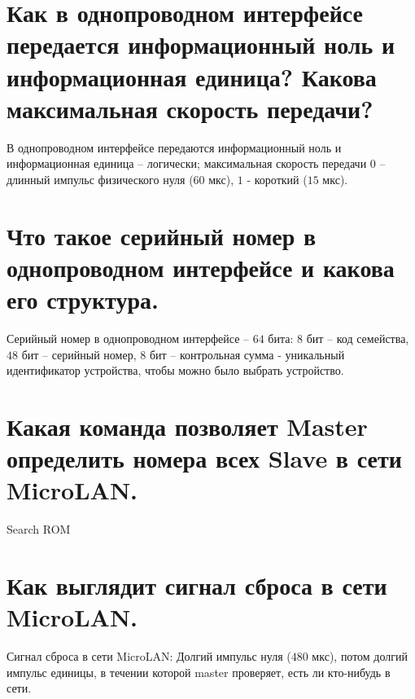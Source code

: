 \section{Как в однопроводном интерфейсе передается информационный ноль и информационная единица? Какова максимальная скорость  передачи?}

В однопроводном интерфейсе передаются информационный ноль и информационная единица -- 
логически; максимальная скорость  передачи $0$ -- длинный импульс физического нуля ($60$ мкс),
$1$ - короткий ($15$ мкс).

\section{Что такое серийный номер в однопроводном интерфейсе и какова его структура.}

Серийный номер в однопроводном интерфейсе -- $64$ бита: $8$ бит -- код семейства, $48$ бит -- 
серийный номер, $8$ бит -- контрольная сумма - уникальный идентификатор устройства, 
чтобы можно было выбрать устройство.

\section{Какая команда позволяет Master определить номера всех Slave в сети MicroLAN.}

Search ROM

\section{Как выглядит сигнал сброса в сети MicroLAN.}

Сигнал сброса в сети MicroLAN: Долгий импульс нуля ($480$ мкс), потом долгий импульс единицы, 
в течении которой master проверяет, есть ли кто-нибудь в сети.
